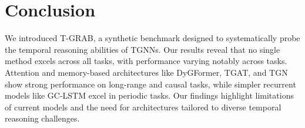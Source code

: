 \section{Conclusion}

We introduced T-GRAB, a synthetic benchmark designed to systematically probe the temporal reasoning abilities of TGNNs. Our results reveal that no single method excels across all tasks, with performance varying notably across tasks. Attention and memory-based architectures like DyGFormer, TGAT, and TGN show strong performance on long-range and causal tasks, while simpler recurrent models like GC-LSTM excel in periodic tasks. Our findings highlight limitations of current models and the need for architectures tailored to diverse temporal reasoning challenges.

